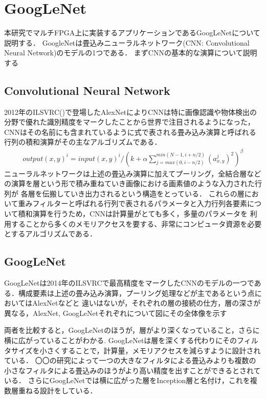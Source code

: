 \chapter{GoogLeNet}
{
\label{chap:googlenet}
本研究でマルチFPGA上に実装するアプリケーションであるGoogLeNetについて説明する．
GoogleNetは畳込みニューラルネットワーク(CNN: Convolutional Neural Network)のモデルの1つである．
まずCNNの基本的な演算について説明する
\section{Convolutional Neural Network}
\label{sec:cnn}
2012年のILSVRC()で登場したAlexNetによりCNNは特に画像認識や物体検出の分野で優れた識別精度をマークしたことから世界で注目されるようになった，
CNNはその名前にも含まれているように式で表される畳み込み演算と呼ばれる行列の積和演算がその主なアルゴリズムである．
\begin{eqnarray}
	output(x, y)^{i} = input(x, y)^{i} / (k + \alpha \sum_{j=max(0, i-n/2)}^{min(N-1, i+n/2)} (a^j_{x, y})^2)^\beta
\end{eqnarray}
ニューラルネットワークは上述の畳込み演算に加えてプーリング，全結合層などの演算を層という形で積み重ねていき画像における画素値のような入力された行列が
各層を伝搬していき出力されるという構造をとっている．
これらの層において重みフィルターと呼ばれる行列で表されるパラメータと入力行列各要素について積和演算を行うため，CNNは計算量がとても多く，多量のパラメータを
利用することから多くのメモリアクセスを要する、非常にコンピュータ資源を必要とするアルゴリズムである．

\section{GoogLeNet}
\label{sec:googlenet}
GoogLeNetは2014年のILSVRCで最高精度をマークしたCNNのモデルの一つである．構成要素は上述の畳み込み演算，プーリング処理などが主であるという点においてはAlexNetなどと
違いはないが，それぞれの層の接続の仕方，層の深さが異なる，AlexNet, GoogLeNetそれぞれについて図にその全体像を示す

両者を比較すると，GoogLeNetのほうが，層がより深くなっていること，さらに横に広がっていることがわかる.
GoogLeNetは層を深くする代わりにそのフィルタサイズを小さくすることで，計算量，メモリアクセスを減らすように設計されている．
〇〇の研究によって一つの大きなフィルタによる畳込みよりも複数の小さなフィルタによる畳込みのほうがより高い精度を出すことができるとされている．
さらにGoogLeNetでは横に広がった層をInception層と名付け，これを複数層重ねる設計をしている．

}
